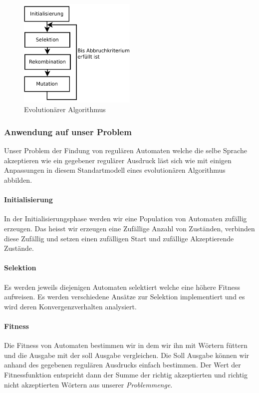 \begin{figure}[h]
  \centering
  \includegraphics[width=0.5\textwidth]{images/evolutionaerer_algorithmus.pdf}
  \caption[Evolutionärer Algorithmus]{Evolutionärer Algorithmus}
  \label{fig:endlicher_automat}
\end{figure}

\subsubsection{Anwendung auf unser Problem}
Unser Problem der Findung von regulären Automaten welche die selbe Sprache akzeptieren wie ein gegebener regulärer Ausdruck läst sich wie mit einigen Anpassungen in diesem Standartmodell eines evolutionären Algorithmus abbilden.

\paragraph{Initialisierung}
In der Initialisierungsphase werden wir eine Population von Automaten zufällig erzeugen. Das heisst wir erzeugen eine Zufällige Anzahl von Zuständen, verbinden diese Zufällig und setzen einen zufälligen Start und zufällige Akzeptierende Zustände.

\paragraph{Selektion}
Es werden jeweils diejenigen Automaten selektiert welche eine höhere Fitness aufweisen. Es werden verschiedene Ansätze zur Selektion implementiert und es wird deren Konvergenzverhalten analysiert.

\paragraph{Fitness}
Die Fitness von Automaten bestimmen wir in dem wir ihn mit Wörtern füttern und die Ausgabe mit der soll Ausgabe vergleichen. Die Soll Ausgabe können wir anhand des gegebenen regulären Ausdrucks einfach bestimmen. Der Wert der Fitnessfunktion entspricht dann der Summe der richtig akzeptierten und richtig nicht akzeptierten Wörtern aus unserer \textit{Problemmenge}.

